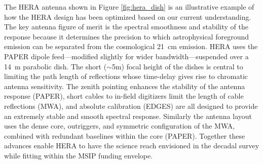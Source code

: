 \documentclass[preprint]{aastex}
\begin{document}
The HERA antenna shown in Figure \ref{fig:hera_dish} is an illustrative example of how the HERA design has been optimized based on our current understanding. The key antenna figure of merit is the spectral smoothness and stability of the response because it determines the precision to which astrophysical foreground emission can be separated from the cosmological 21~cm emission. HERA uses the PAPER dipole feed---modified slightly for wider bandwidth---suspended over a 14~m parabolic dish. The short ($\sim$5m) focal height of the dishes is central to limiting the path length of reflections whose time-delay gives rise to chromatic antenna sensitivity. The zenith pointing enhances the stability of the antenna response (PAPER), short cables to in-field digitizers limit the length of cable reflections (MWA), and absolute calibration (EDGES) are all designed to provide an extremely stable and smooth spectral response. Similarly the antenna layout uses the dense core, outriggers, and symmetric configuration of the MWA, combined with redundant baselines within the core (PAPER). Together these advances enable HERA to have the science reach envisioned in the decadal survey while fitting within the MSIP funding envelope.


\end{document}
